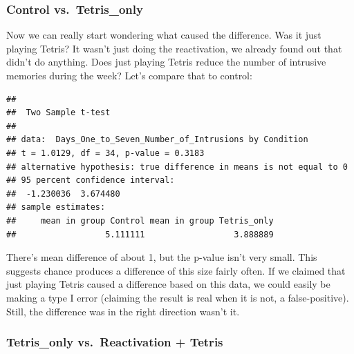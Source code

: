 \documentclass[]{book}
\newenvironment{Shaded}{\begin{snugshade}}{\end{snugshade}}
\newcommand{\KeywordTok}[1]{\textcolor[rgb]{0.13,0.29,0.53}{\textbf{{#1}}}}
\newcommand{\DataTypeTok}[1]{\textcolor[rgb]{0.13,0.29,0.53}{{#1}}}
\newcommand{\StringTok}[1]{\textcolor[rgb]{0.31,0.60,0.02}{{#1}}}
\newcommand{\OtherTok}[1]{\textcolor[rgb]{0.56,0.35,0.01}{{#1}}}
\newcommand{\NormalTok}[1]{{#1}}
\theoremstyle{definition}
\theoremstyle{definition}
\theoremstyle{definition}
\theoremstyle{remark}
\begin{document}
\subsubsection{Control vs.~Tetris\_only}\label{control-vs.tetris_only}

Now we can really start wondering what caused the difference. Was it
just playing Tetris? It wasn't just doing the reactivation, we already
found out that didn't do anything. Does just playing Tetris reduce the
number of intrusive memories during the week? Let's compare that to
control:

\begin{Shaded}
\end{Shaded}

\begin{verbatim}
## 
##  Two Sample t-test
## 
## data:  Days_One_to_Seven_Number_of_Intrusions by Condition
## t = 1.0129, df = 34, p-value = 0.3183
## alternative hypothesis: true difference in means is not equal to 0
## 95 percent confidence interval:
##  -1.230036  3.674480
## sample estimates:
##     mean in group Control mean in group Tetris_only 
##                  5.111111                  3.888889
\end{verbatim}

There's mean difference of about 1, but the p-value isn't very small.
This suggests chance produces a difference of this size fairly often. If
we claimed that just playing Tetris caused a difference based on this
data, we could easily be making a type I error (claiming the result is
real when it is not, a false-positive). Still, the difference was in the
right direction wasn't it.

\subsubsection{Tetris\_only vs.~Reactivation +
Tetris}\label{tetris_only-vs.reactivation-tetris}
\end{document}
